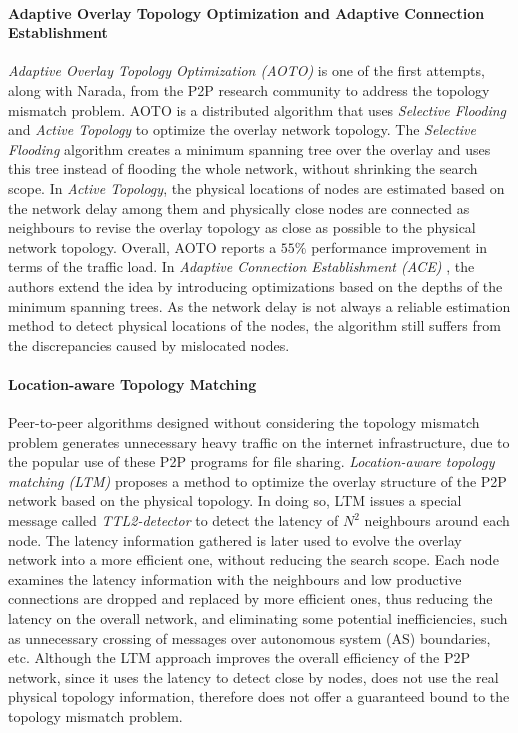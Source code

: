 \documentclass[acmcsur]{acmtrans2m}
\begin{document}
\paragraph*{\bf Adaptive Overlay Topology Optimization and Adaptive Connection
Establishment}

\emph{Adaptive Overlay Topology Optimization (AOTO)} \cite{liu_auto_2003} is one
of the first attempts, along with Narada, from the P2P research community to
address the topology mismatch problem. AOTO is a distributed algorithm
that uses \emph{Selective Flooding} and \emph{Active Topology} to optimize the
overlay network topology. The \emph{Selective Flooding} algorithm creates a minimum
spanning tree over the overlay and uses this tree instead of
flooding the whole network, without shrinking the search scope. 
In \emph{Active Topology}, the physical locations of nodes are estimated based
on the network delay among them and physically close nodes are connected as
neighbours to revise the overlay topology as close as possible to the physical
network topology. Overall, AOTO reports a $55\%$ performance improvement in
terms of the traffic load. In \emph{Adaptive Connection Establishment (ACE)}
\cite{liu_ace_2004}, the authors extend the idea by introducing optimizations
based on the depths of the minimum spanning trees. As the network delay is not always a reliable estimation
method to detect physical locations of the nodes, the algorithm still suffers
from the discrepancies caused by mislocated nodes.

\paragraph*{\bf Location-aware Topology Matching}

Peer-to-peer algorithms designed without considering the topology mismatch
problem generates unnecessary heavy traffic on the internet infrastructure, due
to the popular use of these P2P programs for file sharing. \emph{Location-aware
topology matching (LTM)} \cite{liu_ltm_2004} proposes a method to
optimize the overlay structure of the P2P network based on the physical
topology. In doing so, LTM issues a special message called
\textit{TTL2-detector} to detect the latency of $N^2$ neighbours around each
node. The latency information gathered is later used to evolve the overlay
network into a more efficient one, without reducing the search scope. Each node
examines the latency information with the neighbours and low productive
connections are dropped and replaced by more efficient ones, thus reducing the
latency on the overall network, and eliminating some potential inefficiencies,
such as unnecessary crossing of messages over autonomous system (AS) boundaries, etc. Although the
LTM approach improves the overall efficiency of the P2P network, since it uses
the latency to detect close by nodes, does not use the real physical topology
information, therefore does not offer a guaranteed bound to the
topology mismatch problem.
\end{document}
